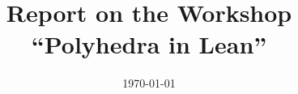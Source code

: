 \documentclass{article}
\begin{document}
\title{Report on the Workshop ``Polyhedra in Lean''}

\date{\today}

\maketitle

%




\end{document}
